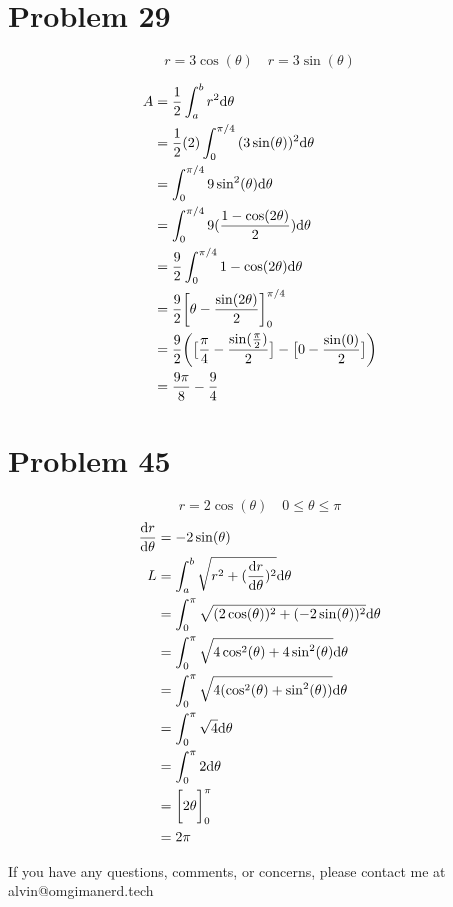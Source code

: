 \documentclass[letterpaper, 12pt]{math}
\begin{document}
\section*{Problem 29}
\[ r = 3\cos(\theta) \quad r = 3\sin(\theta) \]
\begin{center}
\end{center}
\begin{align*}
  A &= \frac{1}{2}\int_{a}^{b}{r^{2}\mathrm{d}{\theta}} \\
  &= \frac{1}{2}(2)\int_{0}^{\pi/4}{(3\sin(\theta))^{2}\mathrm{d}{\theta}} \\
  &= \int_{0}^{\pi/4}{9\sin^{2}(\theta)\mathrm{d}{\theta}} \\
  &= \int_{0}^{\pi/4}{9(\frac{1-\cos(2\theta)}{2})\mathrm{d}{\theta}} \\
  &= \frac{9}{2}\int_{0}^{\pi/4}{1-\cos(2\theta)\mathrm{d}{\theta}} \\
  &= \frac{9}{2}\bigg[\theta-\frac{\sin(2\theta)}{2}\bigg]_{0}^{\pi/4} \\
  &= \frac{9}{2}\bigg(\big[\frac{\pi}{4}-\frac{\sin(\frac{\pi}{2})}{2}\big]-
    \big[0-\frac{\sin(0)}{2}\big]\bigg) \\
  &= \frac{9\pi}{8}-\frac{9}{4}
\end{align*}

\section*{Problem 45}
\[ r = 2\cos(\theta) \quad 0 \leq \theta \leq \pi \]
\begin{align*}
  \frac{\mathrm{d}{r}}{\mathrm{d}{\theta}} &= -2\sin(\theta) \\
  L &= \int_{a}^{b}{\sqrt{r^{2}+(\frac{\mathrm{d}{r}}{\mathrm{d}{\theta}})^{2}}\mathrm{d}{\theta}} \\
  &= \int_{0}^{\pi}
    {\sqrt{(2\cos(\theta))^{2}+(-2\sin(\theta))^{2}}\mathrm{d}{\theta}} \\
  &= \int_{0}^{\pi}
    {\sqrt{4\cos^{2}(\theta)+4\sin^{2}(\theta)}\mathrm{d}{\theta}} \\
  &= \int_{0}^{\pi}
    {\sqrt{4(\cos^{2}(\theta)+\sin^{2}(\theta))}\mathrm{d}{\theta}} \\
  &= \int_{0}^{\pi}{\sqrt{4}\mathrm{d}{\theta}} \\
  &= \int_{0}^{\pi}{2\mathrm{d}{\theta}} \\
  &= \bigg[2\theta\bigg]_{0}^{\pi} \\
  &= 2\pi
\end{align*}

\begin{center}
  If you have any questions, comments, or concerns, please contact me at
  alvin@omgimanerd.tech
\end{center}
\end{document}
